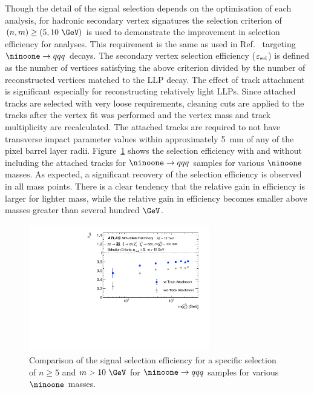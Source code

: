 \documentclass[PUB,UKenglish, texlive=2018]{\ATLASLATEXPATH atlasdoc}
\begin{document}
Though the detail of the signal selection depends on the optimisation of each analysis, for hadronic secondary vertex signatures the selection criterion of $(n, m)\geq(5,10~\GeV)$ is used to demonstrate the improvement in selection efficiency for analyses.
This requirement is the same as used in Ref.~\cite{Aaboud:2017iio} targeting ${\ninoone} \rightarrow qqq$ decays.
The secondary vertex selection efficiency ($\varepsilon_{\rm sel}$) is defined as the number of vertices satisfying the above criterion divided by the number of reconstructed vertices matched to the LLP decay. 
The effect of track attachment is significant especially for reconstructing relatively light LLPs. 
Since attached tracks are selected with very loose requirements, cleaning cuts are applied to the tracks after the vertex fit was performed and the vertex mass and track multiplicity are recalculated.
The attached tracks are required to not have transverse impact parameter values within approximately 5~mm of any of the pixel barrel layer radii.
Figure~\ref{fig:selEff} shows the selection efficiency with and without including the attached tracks for ${\ninoone} \rightarrow qqq$ samples for various $\ninoone$ masses. 
As expected, a significant recovery of the selection efficiency is observed in all mass points. 
There is a clear tendency that the relative gain in efficiency is larger for lighter \ninoone mass, while the relative gain in efficiency becomes smaller above masses greater than several hundred $\GeV$.

\begin{figure}[h]
\begin{center}
\includegraphics[width=0.7\textwidth]{figures/selEff_N1mass.pdf}
\caption{Comparison of the signal selection efficiency for a specific selection of $n\geq 5$ and $m>10~\GeV$ for ${\ninoone} \rightarrow qqq$ samples for various $\ninoone$ masses.}
\label{fig:selEff}
\end{center}
\end{figure}
\end{document}
